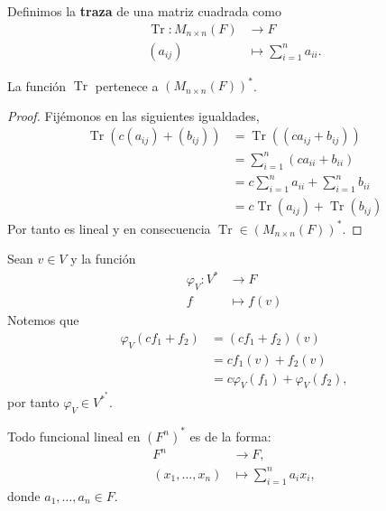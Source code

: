 \documentclass[12pt,a4paper]{book}
\renewcommand{\Tr}{\operatorname{Tr}}
\begin{document}
    \begin{definicion}[Traza]
        Definimos la \textbf{traza} de una matriz cuadrada como
        \begin{align*}
            \Tr: M_{n \times n}(F) & \to F\\
            (a_{ij}) & \mapsto \sum_{i = 1}^na_{ii}.
        \end{align*}
    \end{definicion}

    \begin{proposicion}
        La función $\Tr$ pertenece a $(M_{n \times n}(F))^*$.
    \end{proposicion}

    \begin{proof}
        Fijémonos en las siguientes igualdades,
        \begin{align*}
            \Tr (c(a_{ij}) + (b_{ij})) & = \Tr((ca_{ij} + b_{ij}))\\
            & = \sum_{i = 1}^{n}(ca_{ii} + b_{ii})\\
            & = c\sum_{i = 1}^n a_{ii} + \sum_{i = 1}^{n}b_{ii}\\
            & = c \Tr(a_{ij}) + \Tr(b_{ij})
        \end{align*}
        Por tanto es lineal y en consecuencia $\Tr \in (M_{n \times n}(F))^*$.
    \end{proof}

    \begin{ejemplo}
        Sean $v \in V$ y la función
        \begin{align*}
            \varphi_{V}: V^{*} & \longrightarrow F\\
            f & \longmapsto f(v)
        \end{align*}
        Notemos que
        \begin{align*}
            \varphi_{V}(cf_1 + f_2) & = (cf_1 + f_2)(v)\\
            & = cf_1(v) + f_2(v)\\
            & = c\varphi_V(f_1) + \varphi_V(f_2),
        \end{align*}
        por tanto $\varphi_V \in V^{*^*}$.
    \end{ejemplo}

    \begin{proposicion}
        Todo funcional lineal en $(F^n)^{\ast}$ es de la forma:
        \begin{align*}
            F^n & \to F,\\
            (x_1, \dots, x_n) & \mapsto \sum_{i = 1}^{n}a_ix_i,
        \end{align*}
        donde $a_1, \dots, a_n \in F$.
    \end{proposicion}
\end{document}
